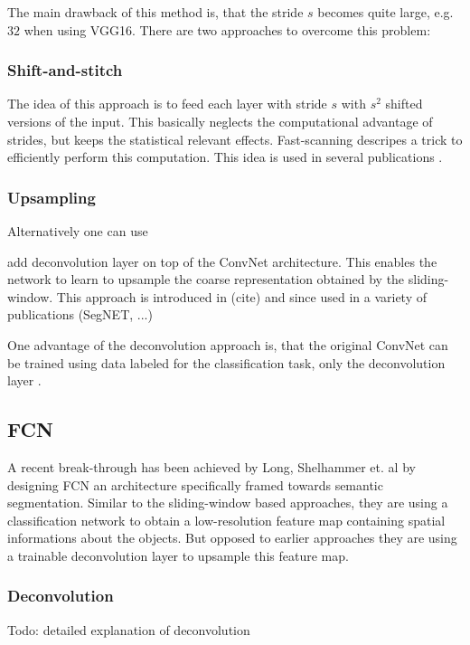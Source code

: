 The main drawback of this method is, that the stride $s$ becomes quite large, e.g. $32$ when using VGG16. There are two approaches to overcome this problem:

\subsubsection{Shift-and-stitch} The idea of this approach is to feed each layer with stride $s$ with $s^2$ shifted versions of the input. This basically neglects the computational advantage of strides, but keeps the statistical relevant effects. Fast-scanning \cite{fast_scanning} descripes a trick to efficiently perform this computation.  This idea is used in several publications \cite{overfeat,huval}.

\subsubsection{Upsampling} Alternatively one can use 


 add deconvolution layer on top of the ConvNet architecture. This enables the network to learn to upsample the coarse representation obtained by the sliding-window. This approach is introduced in (cite) and since used in a variety of publications (SegNET, ...)

One advantage of the deconvolution approach is, that the original ConvNet can be trained using data labeled for the classification task, only the deconvolution layer .

\subsection{FCN}

A recent break-through has been achieved by Long, Shelhammer et. al \cite{fcn} by designing \gls{FCN} an architecture specifically framed towards semantic segmentation. Similar to the sliding-window based approaches, they are using a classification network to obtain a low-resolution feature map containing spatial informations about the objects. But opposed to earlier approaches they are using a trainable deconvolution layer to upsample this feature map.


\subsubsection{Deconvolution} Todo: detailed explanation of deconvolution



